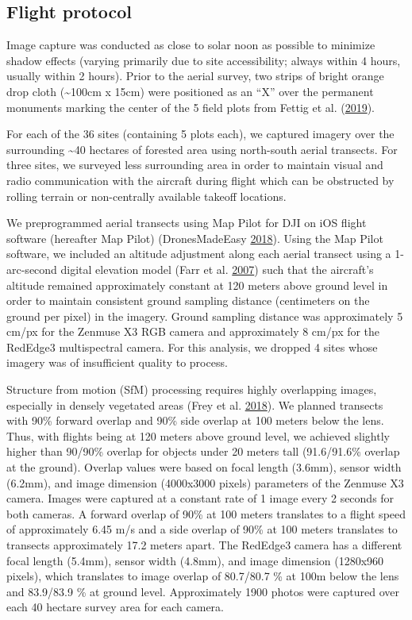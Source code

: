 \documentclass[twoside,12pt,final]{ucthesis-CA2012}
\begin{document}
\begin{ucmainmatter}
\subsection{Flight protocol}\label{flight-protocol}

Image capture was conducted as close to solar noon as possible to
minimize shadow effects (varying primarily due to site accessibility;
always within 4 hours, usually within 2 hours). Prior to the aerial
survey, two strips of bright orange drop cloth (\textasciitilde{}100cm x
15cm) were positioned as an ``X'' over the permanent monuments marking
the center of the 5 field plots from Fettig et al.
(\protect\hyperlink{ref-fettig2019}{2019}).

For each of the 36 sites (containing 5 plots each), we captured imagery
over the surrounding \textasciitilde{}40 hectares of forested area using
north-south aerial transects. For three sites, we surveyed less
surrounding area in order to maintain visual and radio communication
with the aircraft during flight which can be obstructed by rolling
terrain or non-centrally available takeoff locations.

We preprogrammed aerial transects using Map Pilot for DJI on iOS flight
software (hereafter Map Pilot) (DronesMadeEasy
\protect\hyperlink{ref-dronesmadeeasy2018}{2018}). Using the Map Pilot
software, we included an altitude adjustment along each aerial transect
using a 1-arc-second digital elevation model (Farr et al.
\protect\hyperlink{ref-farr2007}{2007}) such that the aircraft's
altitude remained approximately constant at 120 meters above ground
level in order to maintain consistent ground sampling distance
(centimeters on the ground per pixel) in the imagery. Ground sampling
distance was approximately 5 cm/px for the Zenmuse X3 RGB camera and
approximately 8 cm/px for the RedEdge3 multispectral camera. For this
analysis, we dropped 4 sites whose imagery was of insufficient quality
to process.

Structure from motion (SfM) processing requires highly overlapping
images, especially in densely vegetated areas (Frey et al.
\protect\hyperlink{ref-frey2018}{2018}). We planned transects with 90\%
forward overlap and 90\% side overlap at 100 meters below the lens.
Thus, with flights being at 120 meters above ground level, we achieved
slightly higher than 90/90\% overlap for objects under 20 meters tall
(91.6/91.6\% overlap at the ground). Overlap values were based on focal
length (3.6mm), sensor width (6.2mm), and image dimension (4000x3000
pixels) parameters of the Zenmuse X3 camera. Images were captured at a
constant rate of 1 image every 2 seconds for both cameras. A forward
overlap of 90\% at 100 meters translates to a flight speed of
approximately 6.45 m/s and a side overlap of 90\% at 100 meters
translates to transects approximately 17.2 meters apart. The RedEdge3
camera has a different focal length (5.4mm), sensor width (4.8mm), and
image dimension (1280x960 pixels), which translates to image overlap of
80.7/80.7 \% at 100m below the lens and 83.9/83.9 \% at ground level.
Approximately 1900 photos were captured over each 40 hectare survey area
for each camera.


\end{ucmainmatter}
\end{document}
